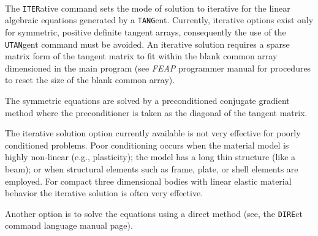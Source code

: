  \\{\smallskip}
\headb

The {\tt ITER}ative command sets the mode of solution to iterative
for the linear algebraic
equations generated by a {\tt TANG}ent.  Currently, iterative options
exist only for symmetric, positive definite
tangent arrays, consequently the use of the
{\tt UTAN}gent command must be avoided.  An
iterative solution requires a sparse matrix form of the tangent matrix to fit
within the blank common array dimensioned in the main program (see
\textsl{FEAP} programmer manual for procedures to reset the size of the
blank common array).

The symmetric equations are solved by a preconditioned conjugate gradient
method where the preconditioner is taken as the diagonal of
the tangent matrix.

The iterative solution option currently available is not very effective
for poorly conditioned problems.  Poor conditioning occurs when the material
model is highly non-linear (e.g., plasticity); the model has a long thin
structure (like a beam); or when structural elements such as frame, plate,
or shell elements are employed.  For compact three dimensional bodies with
linear elastic material behavior the iterative solution is often very
effective.

Another option is to solve the equations using a direct
method (see, the {\tt DIRE}ct command language manual page).
\vfill\eject
